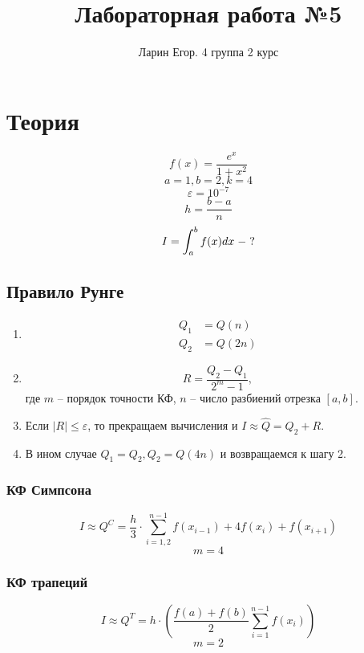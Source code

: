 \documentclass{article}
\title{Лабораторная работа №5}
\author{Ларин Егор. 4 группа 2 курс}
\begin{document}
\maketitle
\section*{Теория}
\[f(x) = \frac{e^x}{1+x^2}\]
\[a = 1, b =2, k = 4\]
\[ \boxed{\varepsilon = 10 ^{-7}}\]
\[h = \frac{b-a}{n}\]
\[I = \int_a^b f(x)dx \hspace{0.1cm} - \hspace{0.1cm} ? \]
\subsection*{Правило Рунге}
\begin{enumerate}
\item \begin{equation*}
    \begin{split}
        Q_1 &= Q(n) \\
        Q_2 &= Q(2n)
    \end{split}
\end{equation*}
\item \[R = \frac{Q_2 - Q_1} {2^m -1},\]
где $m$ -- порядок точности КФ, $n$ -- число разбиений отрезка $\left[a, b\right]$.
    \item Если $\left| R\right| \leq \varepsilon $, то прекращаем вычисления и $I \approx \hat{Q} = Q_2 + R$.
    \item В ином случае $Q_1 = Q_2, Q_2 = Q(4n)$ и возвращаемся к шагу 2.
\end{enumerate} 
\subsubsection*{КФ Симпсона}
\[
I \approx Q^C = \frac{h}{3} \cdot \sum_{i=1,2}^{n-1} f(x_{i-1}) + 4 f(x_i) + f(x_{i+1})
\]
\[m=4\]
\subsubsection*{КФ трапеций}
\[
I \approx Q^T = h \cdot \left(\frac{f(a) + f(b)}{2} \sum_{i=1}^{n-1} f(x_i)  \right)
\]
\[m=2\]
\end{document}
